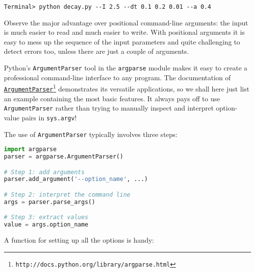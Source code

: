 \documentclass[graybox,sectrefs,envcountresetchap,open=right,final]{svmonodo}
\begin{document}
\begin{Verbatim}[frame=lines,label=\fbox{{\tiny Terminal}},framesep=2.5mm,framerule=0.7pt,fontsize=\fontsize{9pt}{9pt}]
Terminal> python decay.py --I 2.5 --dt 0.1 0.2 0.01 --a 0.4

\end{Verbatim}

Observe the major advantage over positional command-line arguments:
the input is much easier to read and much easier to write.
With positional arguments it is easy to mess up the sequence of
the input parameters and quite challenging to detect errors too,
unless there are just a couple of arguments.

Python's \texttt{ArgumentParser} tool in the \texttt{argparse} module makes it easy
to create a professional command-line interface to any program. The
documentation of \href{{http://docs.python.org/library/argparse.html}}{\nolinkurl{ArgumentParser}\footnote{\texttt{http://docs.python.org/library/argparse.html}}} demonstrates its
versatile applications, so we shall here just list an example
containing the most basic features. It always pays off to use \texttt{ArgumentParser}
rather than trying to manually inspect and interpret option-value pairs
in \texttt{sys.argv}!

The use of \texttt{ArgumentParser} typically involves three steps:













\begin{lstlisting}[language=python,style=blue1_bluegreen]
import argparse
parser = argparse.ArgumentParser()

# Step 1: add arguments
parser.add_argument('--option_name', ...)

# Step 2: interpret the command line
args = parser.parse_args()

# Step 3: extract values
value = args.option_name

\end{lstlisting}


A function for setting up all the options is handy:
\end{document}
